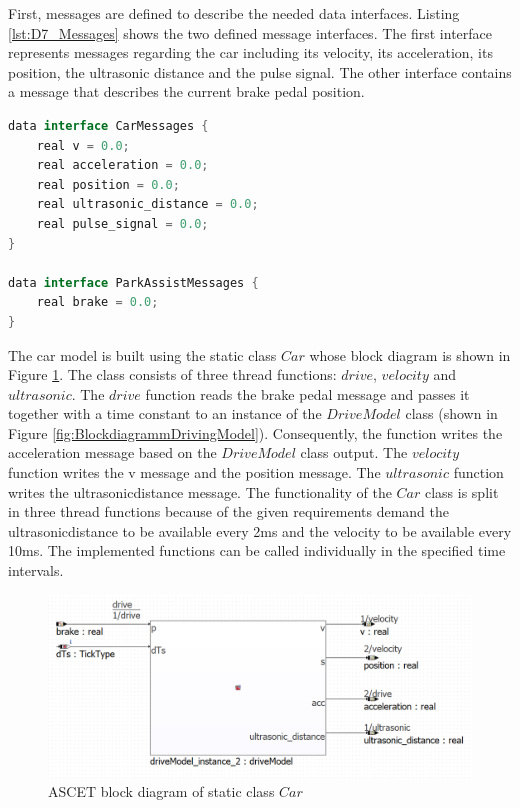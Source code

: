 First, messages are defined to describe the needed data interfaces. Listing \ref{lst:D7_Messages} shows the two defined message interfaces. The first interface represents messages regarding the car including its velocity, its acceleration, its position, the ultrasonic distance and the pulse signal. The other interface contains a message that describes the current brake pedal position.

\begin{lstlisting}[language=Java,basicstyle=\scriptsize, caption= Defined messages in ASCET,label= lst:D7_Messages]
data interface CarMessages {
	real v = 0.0;
	real acceleration = 0.0;
	real position = 0.0;
	real ultrasonic_distance = 0.0;
	real pulse_signal = 0.0;
}

data interface ParkAssistMessages {
	real brake = 0.0;
}
\end{lstlisting}

The car model is built using the static class $Car$ whose block diagram is shown in Figure \ref{fig:BlockdiagrammCar}. The class consists of three thread functions: $drive$, $velocity$ and $ultrasonic$. The $drive$ function reads the brake pedal message and passes it together with a time constant to an instance of the $DriveModel$ class (shown in Figure \ref{fig:BlockdiagrammDrivingModel}). Consequently, the function writes the acceleration message based on the $DriveModel$ class output. The $velocity$ function writes the v message and the position message. The $ultrasonic$ function writes the ultrasonic\textunderscore distance message. The functionality of the $Car$ class is split in three thread functions because of the given requirements demand the ultrasonic\textunderscore distance to be available every 2ms and the velocity to be available every 10ms. The implemented functions can be called individually in the specified time intervals.

\begin{figure}[H]
\centering
\includegraphics[width=1\textwidth]{images/Blockdiagramm_car.png}
\caption{ASCET block diagram of static class $Car$}
\label{fig:BlockdiagrammCar}
\end{figure}

